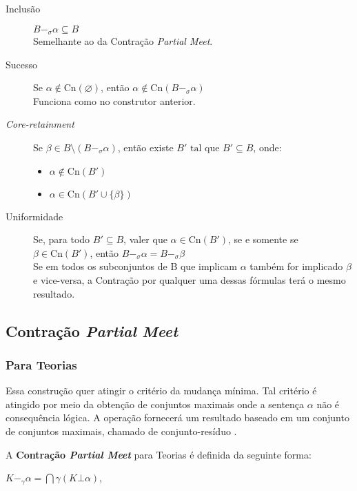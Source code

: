 \begin{description}
	\item[Inclusão] $ B -_{\sigma} \alpha \subseteq B$ \\ Semelhante ao da Contração \textit{Partial Meet}.
	\item[Sucesso] Se $ \alpha \notin \text{Cn}(\varnothing) $, então $ \alpha \notin \text{Cn}(B -_{\sigma} \alpha) $ \\ Funciona como no construtor anterior.
	\item[\textit{Core-retainment}] Se $ \beta \in B \setminus (B -_{\sigma} \alpha) $, então existe $ B' \text{ tal que } B' \subseteq B $, onde:
	\begin{itemize}
		\item $ \alpha \notin \text{Cn}(B') $
		\item $ \alpha \in \text{Cn}(B' \cup \{\beta\}) $ 
	\end{itemize}
	\item[Uniformidade] Se, para todo $ B' \subseteq B $, valer que $ \alpha \in \text{Cn}(B') $, se e somente se $ \beta \in \text{Cn}(B') $, então $ B -_{\sigma} \alpha = B -_{\sigma} \beta $ \\
	Se em todos os subconjuntos de B que implicam $ \alpha $ também for implicado $ \beta $ e vice-versa, a Contração por qualquer uma dessas fórmulas terá o mesmo resultado.
\end{description}

\subsection{Contração \textit{Partial Meet}}

\subsubsection{Para Teorias}

Essa construção quer atingir o critério da mudança mínima. Tal critério é atingido por meio da obtenção de conjuntos maximais onde a sentença $ \alpha $ não é consequência lógica. A operação fornecerá um resultado baseado em um conjunto de conjuntos maximais, chamado de conjunto-resíduo \citep{revisaoCobe}.

A \textbf{Contração \textit{Partial Meet}} para Teorias é definida da seguinte forma: 

\begin{center}
	$ K -_{\gamma} \alpha = \bigcap \gamma(K \bot \alpha) $,
\end{center}

